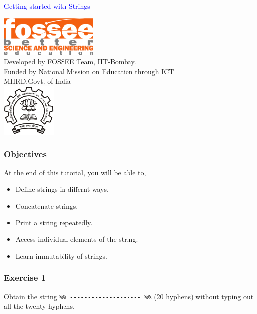 \documentclass[presentation]{beamer}
\title{}
\author{FOSSEE}
\date{}
\begin{document}
\begin{frame}

\begin{center}
\vspace{12pt}
\textcolor{blue}{\huge Getting started with Strings}
\end{center}
\vspace{18pt}
\begin{center}
\vspace{10pt}
\includegraphics[scale=0.95]{../images/fossee-logo.png}\\
\vspace{5pt}
\scriptsize Developed by FOSSEE Team, IIT-Bombay. \\ 
\scriptsize Funded by National Mission on Education through ICT\\
\scriptsize  MHRD,Govt. of India\\
\includegraphics[scale=0.30]{../images/iitb-logo.png}\\
\end{center}
\end{frame}
\begin{frame}
\frametitle{Objectives}
\label{sec-2}

  At the end of this tutorial, you will be able to, 

\begin{itemize}
\item Define strings in differnt ways.
\item Concatenate strings.
\item Print a string repeatedly.
\item Access individual elements of the string.
\item Learn immutability of strings.
\end{itemize}
\end{frame}
\begin{frame}
\frametitle{Exercise 1}
\label{sec-3}

  Obtain the string \verb~%% -------------------- %%~ (20 hyphens) without
  typing out all the twenty hyphens.
\end{frame}
\end{document}
